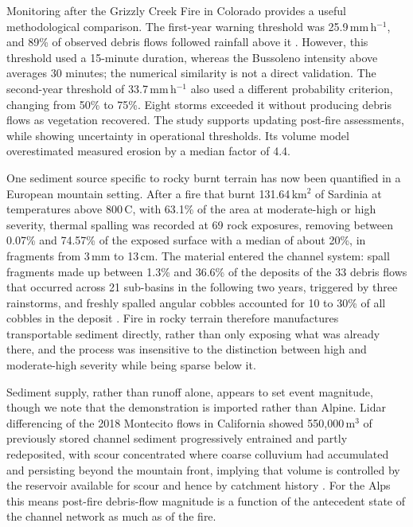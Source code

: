 \documentclass[11pt,a4paper]{article}
\begin{document}
Monitoring after the Grizzly Creek Fire in Colorado provides a useful methodological comparison. The first-year warning threshold was 25.9\,mm\,h$^{-1}$, and 89\% of observed debris flows followed rainfall above it \citep{rengers_evaluating_2024}. However, this threshold used a 15-minute duration, whereas the Bussoleno intensity above averages 30 minutes; the numerical similarity is not a direct validation. The second-year threshold of 33.7\,mm\,h$^{-1}$ also used a different probability criterion, changing from 50\% to 75\%. Eight storms exceeded it without producing debris flows as vegetation recovered. The study supports updating post-fire assessments, while showing uncertainty in operational thresholds. Its volume model overestimated measured erosion by a median factor of 4.4.

One sediment source specific to rocky burnt terrain has now been quantified in a European mountain setting. After a fire that burnt 131.64\,km$^2$ of Sardinia at temperatures above 800\,\degree{}C, with 63.1\% of the area at moderate-high or high severity, thermal spalling was recorded at 69 rock exposures, removing between 0.07\% and 74.57\% of the exposed surface with a median of about 20\%, in fragments from 3\,mm to 13\,cm. The material entered the channel system: spall fragments made up between 1.3\% and 36.6\% of the deposits of the 33 debris flows that occurred across 21 sub-basins in the following two years, triggered by three rainstorms, and freshly spalled angular cobbles accounted for 10 to 30\% of all cobbles in the deposit \citep{pala_sediment_2025}. Fire in rocky terrain therefore manufactures transportable sediment directly, rather than only exposing what was already there, and the process was insensitive to the distinction between high and moderate-high severity while being sparse below it.

Sediment supply, rather than runoff alone, appears to set event magnitude, though we note that the demonstration is imported rather than Alpine. Lidar differencing of the 2018 Montecito flows in California showed 550{,}000\,m$^3$ of previously stored channel sediment progressively entrained and partly redeposited, with scour concentrated where coarse colluvium had accumulated and persisting beyond the mountain front, implying that volume is controlled by the reservoir available for scour and hence by catchment history \citep{morell_sediment_2021}. For the Alps this means post-fire debris-flow magnitude is a function of the antecedent state of the channel network as much as of the fire.
\end{document}
